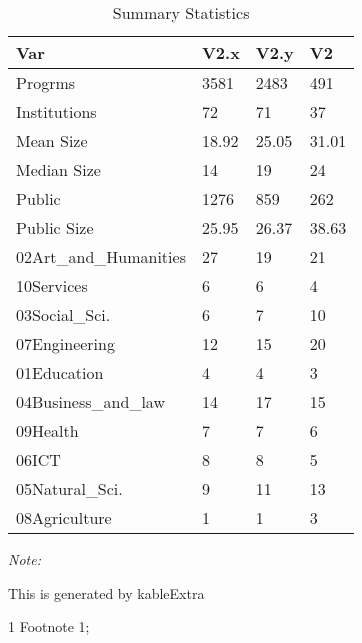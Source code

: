 \begin{table}
\centering
\caption{Summary Statistics}
\centering
\begin{threeparttable}
\begin{tabular}[t]{llll}
\toprule
Var & V2.x & V2.y & V2\\
\midrule
Progrms & 3581 & 2483 & 491\\
Institutions & 72 & 71 & 37\\
Mean Size & 18.92 & 25.05 & 31.01\\
Median Size & 14 & 19 & 24\\
Public & 1276 & 859 & 262\\
\addlinespace
Public Size & 25.95 & 26.37 & 38.63\\
02Art\_and\_Humanities & 27 & 19 & 21\\
10Services & 6 & 6 & 4\\
03Social\_Sci. & 6 & 7 & 10\\
07Engineering & 12 & 15 & 20\\
\addlinespace
01Education & 4 & 4 & 3\\
04Business\_and\_law & 14 & 17 & 15\\
09Health & 7 & 7 & 6\\
06ICT & 8 & 8 & 5\\
05Natural\_Sci. & 9 & 11 & 13\\
\addlinespace
08Agriculture & 1 & 1 & 3\\
\bottomrule
\end{tabular}
\begin{tablenotes}
\item \textit{Note: } 
\item This is generated by kableExtra
\item[1] Footnote 1; 
\end{tablenotes}
\end{threeparttable}
\end{table}
